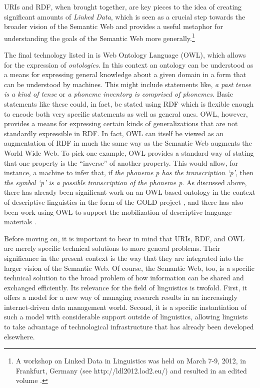 URIs and RDF, when brought together, are key pieces to the idea of creating
significant amounts of \emph{Linked Data}, which is seen as a crucial step
towards the broader vision of the Semantic Web \citep[15]{BizerEtAl:2009}
and provides a useful metaphor for understanding the goals of the Semantic
Web more generally.{\footnote{A workshop on Linked Data in Linguistics was
held on March 7-9, 2012, in Frankfurt, Germany (see http://ldl2012.lod2.eu/)
and resulted in an edited volume \citep{LDL:2012}.}}

The final technology listed in  is Web Ontology Language (OWL),
which allows for the expression of \emph{ontologies}. In this context an
ontology can be understood as a means for expressing general knowledge about a
given domain in a form that can be understood by machines. This might include
statements like, \emph{a past tense is a kind of tense} or \emph{a phoneme
inventory is comprised of phonemes}. Basic statements like these could, in fact,
be stated using RDF which is flexible enough to encode both very specific
statements as well as general ones. OWL, however, provides a means for
expressing certain kinds of generalizations that are not standardly expressible
in RDF. In fact, OWL can itself be viewed as an augmentation of RDF in much the
same way as the Semantic Web augments the World Wide Web. To pick one example,
OWL provides a standard way of stating that one property is the ``inverse'' of
another property. This would allow, for instance, a machine to infer that, if
\emph{the phoneme \emph{p} has the transcription `p'}, then \emph{the symbol
`{p}' is a possible transcription of the phoneme \emph{p}}. As discussed above,
there has already been significant work on an OWL-based ontology in the context
of descriptive linguistics in the form of the GOLD project
\citep{FarrarLangendoen:2003,FarrarLewis:2007,FarrarLangendoen:2009}, and there
has also been work using OWL to support the mobilization of descriptive language
materials \citep{BeckEtAl:2007}.

Before moving on, it is important to bear in mind that URIs, RDF, and OWL are
merely specific technical solutions to more general problems. Their significance
in the present context is the way that they are integrated into the larger
vision of the Semantic Web. Of course, the Semantic Web, too, is a specific
technical solution to the broad problem of how information can be shared and
exchanged efficiently. Its relevance for the field of linguistics is twofold.
First, it offers a model for a new way of managing research results in an
increasingly internet-driven data management world. Second, it is a specific
instantiation of such a model with considerable support outside of linguistics,
allowing linguists to take advantage of technological infrastructure that has
already been developed elsewhere.

